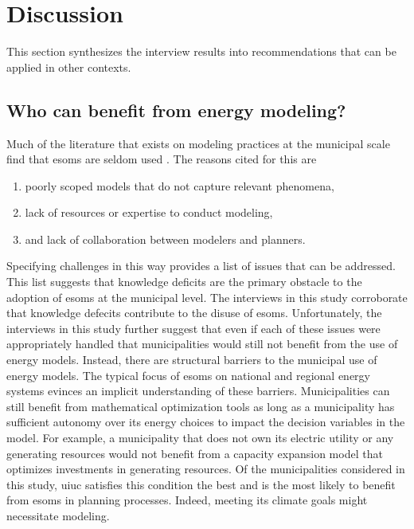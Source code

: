 \section{Discussion}
\label{section:interview-discussion}
This section synthesizes the interview results into recommendations that can be
applied in other contexts.

\subsection{Who can benefit from energy modeling?}
Much of the literature that exists on modeling practices at the municipal scale
find that \acp{esom} are seldom used
\cite{ben_amer_too_2020,johannsen_municipal_2023}. The reasons cited for this
are \cite{ben_amer_too_2020,johannsen_municipal_2023,susser_better_2022}
\begin{enumerate}
    \item poorly scoped models that do not capture relevant phenomena,
    \item lack of resources or expertise to conduct modeling, 
    \item and lack of collaboration between modelers and planners.
\end{enumerate} 
Specifying challenges in this way provides a list of issues that can be
addressed. This list suggests that knowledge deficits are the primary obstacle
to the adoption of \acp{esom} at the municipal level. The interviews in this
study corroborate that knowledge defecits contribute to the disuse of
\acp{esom}. Unfortunately, the interviews in this study further suggest that
even if each of these issues were appropriately handled that municipalities
would still not benefit from the use of energy models. Instead, there are
structural barriers to the municipal use of energy models. The typical focus of
\acp{esom} on national and regional energy systems evinces an implicit
understanding of these barriers. Municipalities can still benefit from
mathematical optimization tools as long as a municipality has sufficient
autonomy over its energy choices to impact the decision variables in the model.
For example, a municipality that does not own its electric utility or any
generating resources would not benefit from a capacity expansion model that
optimizes investments in generating resources. Of the municipalities considered
in this study, \ac{uiuc} satisfies this condition the best and is the most
likely to benefit from \acp{esom} in planning processes. Indeed, meeting its
climate goals might necessitate modeling.

